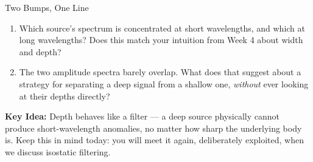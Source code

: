 \begin{activity}[warmup]{Two Bumps, One Line}
\begin{questions}[resume]
    \begin{enumerate}[label=\roman*]
        \item Which source's spectrum is concentrated at short wavelengths, and which at long wavelengths? Does this match your intuition from Week 4 about width and depth?
        \answerbox[2cm]

        \item The two amplitude spectra barely overlap. What does that suggest about a strategy for separating a deep signal from a shallow one, \emph{without} ever looking at their depths directly?
        \answerbox[2cm]
    \end{enumerate}
\end{questions}

\bigskip

\textbf{Key Idea:} Depth behaves like a filter --- a deep source physically cannot produce short-wavelength anomalies, no matter how sharp the underlying body is. Keep this in mind today: you will meet it again, deliberately exploited, when we discuss isostatic filtering.

\end{activity}
